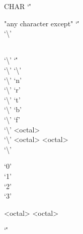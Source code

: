 \documentclass[convert={outext=.png}]{standalone}
\begin{document}
\begin{málrit}{CHAR}
	`\''
	\begin{stack}
		\begin{stack}
			"any character except" `\''\\
			`\textbackslash '
		\end{stack}\\
		`\textbackslash ' `\''\\
		`\textbackslash ' `\textbackslash '\\
		`\textbackslash ' `n'\\
		`\textbackslash ' `r'\\
		`\textbackslash ' `t'\\
		`\textbackslash ' `b'\\
		`\textbackslash ' `f'\\
		`\textbackslash ' <octal>\\
		`\textbackslash ' <octal> <octal>\\
		`\textbackslash '
		\begin{stack}
			`0'\\
			`1'\\
			`2'\\
			`3'
		\end{stack}
		<octal> <octal>
	\end{stack}
	`\''
\end{málrit}
\end{document}
